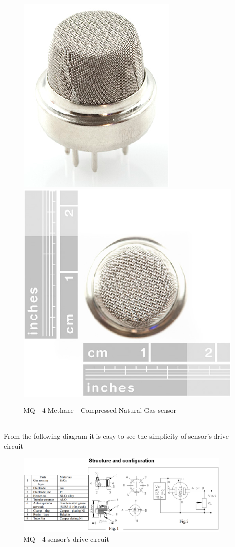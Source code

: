\documentclass[12pt,a4paper]{report}
\begin{document}
\begin{figure}[H]
\centering
\includegraphics*[scale=0.45]{mq4}
\includegraphics*[scale=0.45]{mq4_2}
\caption{MQ - 4 Methane - Compressed Natural Gas sensor}
\end{figure}
\ \\
%
From the following diagram it is easy to see the simplicity of sensor's drive circuit.
\begin{figure}[H]
\centering
\includegraphics*[width=400px]{mq4_structure-configuration}
\centering
\caption{MQ - 4 sensor's drive circuit}
\end{figure}
\end{document}
